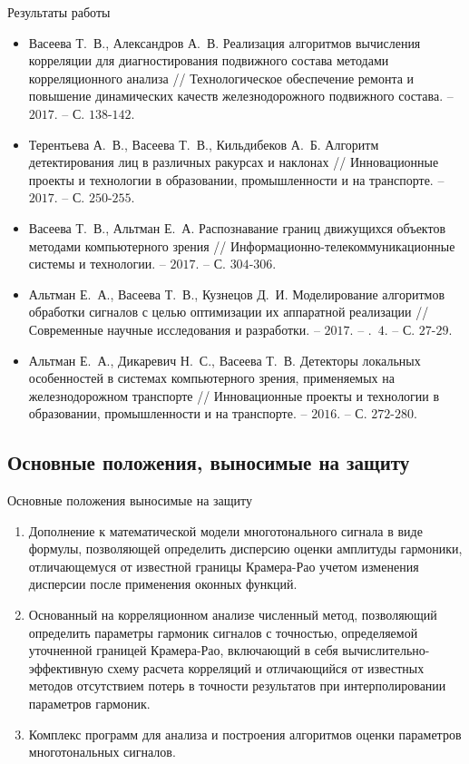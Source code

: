 \begin{frame}{Результаты работы}
\scriptsize{
\begin{itemize}
	\item Васеева Т.~В., Александров А.~В. Реализация алгоритмов вычисления корреляции для диагностирования подвижного состава методами корреляционного анализа // Технологическое обеспечение ремонта и повышение динамических качеств железнодорожного подвижного состава. – $2017$. – С. $138$-$142$.
	
	\item Терентьева А.~В., Васеева Т.~В., Кильдибеков А.~Б. Алгоритм детектирования лиц в различных ракурсах и наклонах // Инновационные проекты и технологии в образовании, промышленности и на транспорте. – $2017$. – С. $250$-$255$.
	
	\item Васеева Т.~В., Альтман Е.~А. Распознавание границ движущихся объектов методами компьютерного зрения // Информационно-телекоммуникационные системы и технологии. – $2017$. – С. $304$-$306$.
	
	\item Альтман Е.~А., Васеева Т.~В., Кузнецов Д.~И. Моделирование алгоритмов обработки сигналов с целью оптимизации их аппаратной реализации // Современные научные исследования и разработки. – $2017$. – \textnumero.~$4$. – С. $27$-$29$.	
	
	\item Альтман Е.~А., Дикаревич Н.~С., Васеева Т.~В. Детекторы локальных особенностей в системах компьютерного зрения, применяемых на железнодорожном транспорте // Инновационные проекты и технологии в образовании, промышленности и на транспорте. – $2016$. – С. $272$-$280$.
\end{itemize}}
\end{frame}

\subsection{Основные положения, выносимые на защиту}
\begin{frame}{Основные положения выносимые на защиту}
	\begin{enumerate}
		\item Дополнение к математической модели многотонального сигнала в виде формулы, позволяющей определить дисперсию оценки амплитуды гармоники, отличающемуся от известной границы Крамера-Рао учетом изменения дисперсии после применения оконных функций.
		\item Основанный на корреляционном анализе численный метод, позволяющий определить параметры гармоник сигналов с точностью, определяемой уточненной границей Крамера-Рао, включающий в себя вычислительно-эффективную схему расчета корреляций и отличающийся от известных методов отсутствием потерь в точности результатов при интерполировании параметров гармоник.
		\item Комплекс программ для анализа и построения алгоритмов оценки параметров многотональных сигналов.
	\end{enumerate}
\end{frame}

